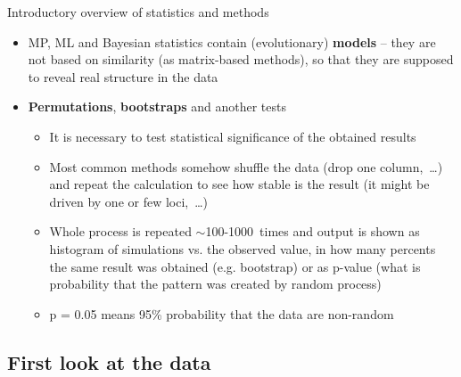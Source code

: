 \documentclass[compress, ucs, xelatex, 11pt, xcolor=svgnames,
  hyperref={
    bookmarks=true,
    unicode=true,
    colorlinks=true,
    pdftitle={Molecular data in R},
    plainpages=false,
    pdfauthor={Vojtech Zeisek},
    pdfsubject={Course about phylogeny and evolution in R},
    pdfcreator={XeLaTeX},
    pdfkeywords={R, evolution, phylogeny, molecular data},
    linkcolor=Tomato,
    anchorcolor=SaddleBrown,
    citecolor=Goldenrod,
    filecolor=DarkMagenta,
    menucolor=Sienna,
    urlcolor=DarkTurquoise,
    pdftex},
  url={hyphens, lowtilde} %
  ]{beamer}
\begin{document}
\begin{frame}[allowframebreaks]{Introductory overview of statistics and methods}
\begin{itemize}
\begin{itemize}
      \begin{itemize}
	\item After some time it converges to find optimal solution (usually described by logarithms of likelihood of given model)
	\item Usually, $\sim$millions (or even more) of generations are required
	\item Beginning use to be very unstable -- it is discarded as burn-in (``heating'' of Markov Chain Monte Carlo (MCMC) doing the exploration and optimization of models), usually $\sim$10-25\%~of steps
      \end{itemize}
    \end{itemize}
    \item MP, ML and Bayesian statistics contain (evolutionary) \textbf{models} -- they are not based on similarity (as matrix-based methods), so that they are supposed to reveal real structure in the data
    \item \textbf{Permutations}, \textbf{bootstraps} and another tests
    \begin{itemize}
      \item It is necessary to test statistical significance of the obtained results
      \item Most common methods somehow shuffle the data (drop one column,~\ldots) and repeat the calculation to see how stable is the result (it might be driven by one or few loci,~\ldots)
      \item Whole process is repeated $\sim$100-1000~times and output is shown as histogram of simulations vs. the observed value, in how many percents the same result was obtained (e.g. bootstrap) or as p-value (what is probability that the pattern was created by random process)
      \item p = 0.05 means 95\% probability that the data are non-random
    \end{itemize}
  \end{itemize}
\end{frame}

\subsection{First look at the data}
\end{document}
